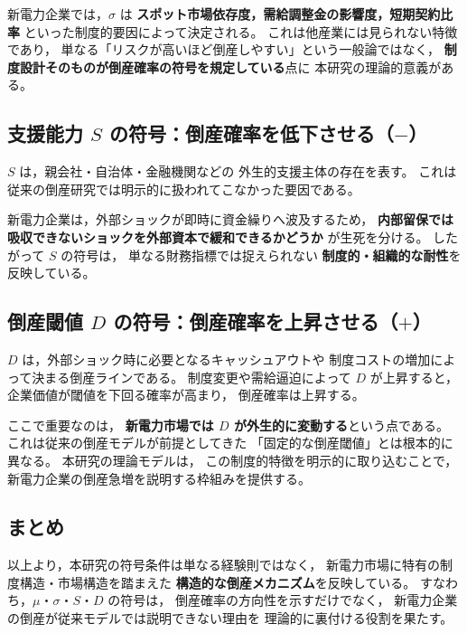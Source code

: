 新電力企業では，$\sigma$ は
\textbf{スポット市場依存度，需給調整金の影響度，短期契約比率}
といった制度的要因によって決定される。
これは他産業には見られない特徴であり，
単なる「リスクが高いほど倒産しやすい」という一般論ではなく，
\textbf{制度設計そのものが倒産確率の符号を規定している}点に
本研究の理論的意義がある。

\subsection*{支援能力 $S$ の符号：倒産確率を低下させる（$-$）}

$S$ は，親会社・自治体・金融機関などの
外生的支援主体の存在を表す。
これは従来の倒産研究では明示的に扱われてこなかった要因である。

新電力企業は，外部ショックが即時に資金繰りへ波及するため，
\textbf{内部留保では吸収できないショックを外部資本で緩和できるかどうか}
が生死を分ける。
したがって $S$ の符号は，
単なる財務指標では捉えられない
\textbf{制度的・組織的な耐性}を反映している。

\subsection*{倒産閾値 $D$ の符号：倒産確率を上昇させる（$+$）}

$D$ は，外部ショック時に必要となるキャッシュアウトや
制度コストの増加によって決まる倒産ラインである。
制度変更や需給逼迫によって $D$ が上昇すると，
企業価値が閾値を下回る確率が高まり，
倒産確率は上昇する。

ここで重要なのは，
\textbf{新電力市場では $D$ が外生的に変動する}という点である。
これは従来の倒産モデルが前提としてきた
「固定的な倒産閾値」とは根本的に異なる。
本研究の理論モデルは，
この制度的特徴を明示的に取り込むことで，
新電力企業の倒産急増を説明する枠組みを提供する。

\subsection*{まとめ}

以上より，本研究の符号条件は単なる経験則ではなく，
新電力市場に特有の制度構造・市場構造を踏まえた
\textbf{構造的な倒産メカニズム}を反映している。
すなわち，$\mu$・$\sigma$・$S$・$D$ の符号は，
倒産確率の方向性を示すだけでなく，
新電力企業の倒産が従来モデルでは説明できない理由を
理論的に裏付ける役割を果たす。



